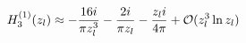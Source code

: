 \begin{equation}
H_3^{(1)}(z_l)\approx -\frac{16 i }{\pi z_l^3} -\frac{2i}{\pi z_l}
                      -\frac{z_l i}{4 \pi} 
                      + {\cal O} (z_l^3 \ln z_l) 
\label{approx2}
\end{equation} 

